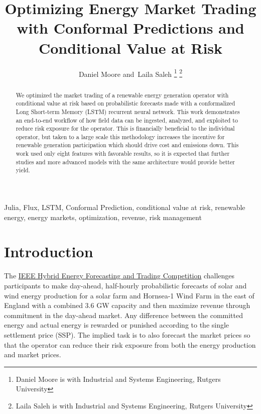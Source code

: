 \documentclass[
  journal,
]{IEEEtran}%
\title{Optimizing Energy Market Trading with Conformal Predictions and
Conditional Value at Risk}
\author{
Daniel Moore
and~Laila Saleh%
\thanks{Daniel Moore is with Industrial and Systems Engineering, Rutgers
University%
}
\thanks{Laila Saleh is with Industrial and Systems Engineering, Rutgers
University%
}
}
\begin{document}


\maketitle

\begin{abstract}
We optimized the market trading of a renewable energy generation
operator with conditional value at risk based on probabilistic forecasts
made with a conformalized Long Short-term Memory (LSTM) recurrent neural
network. This work demonstrates an end-to-end workflow of how field data
can be ingested, analyzed, and exploited to reduce risk exposure for the
operator. This is financially beneficial to the individual operator, but
taken to a large scale this methodology increases the incentive for
renewable generation participation which should drive cost and emissions
down. This work used only eight features with favorable results, so it
is expected that further studies and more advanced models with the same
architecture would provide better yield.
\end{abstract}
\begin{IEEEkeywords}
Julia, Flux, LSTM, Conformal Prediction, conditional value at
risk, renewable energy, energy markets, optimization, revenue, risk
management
\end{IEEEkeywords}

%


\section{Introduction}\label{introduction}

The
\href{https://ieee-dataport.org/competitions/hybrid-energy-forecasting-and-trading-competition}{IEEE
Hybrid Energy Forecasting and Trading Competition} challenges
participants to make day-ahead, half-hourly probabilistic forecasts of
solar and wind energy production for a solar farm and Hornsea-1 Wind
Farm in the east of England with a combined 3.6 GW capacity and then
maximize revenue through commitment in the day-ahead market. Any
difference between the committed energy and actual energy is rewarded or
punished according to the single settlement price (SSP). The implied
task is to also forecast the market prices so that the operator can
reduce their risk exposure from both the energy production and market
prices.
\end{document}
